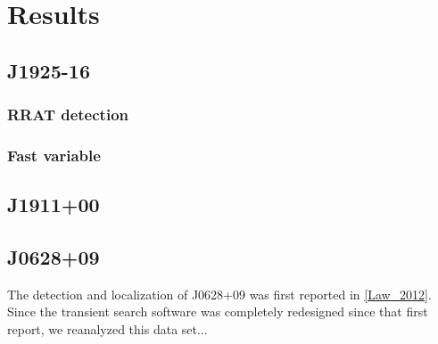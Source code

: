 \section{Results}

\subsection{J1925-16}
\subsubsection{RRAT detection}


\subsubsection{Fast variable}


\subsection{J1911+00}

\subsection{J0628+09}

The detection and localization of J0628+09 was first reported in \ref{Law_2012}. Since the transient search software was completely redesigned since that first report, we reanalyzed this data set...